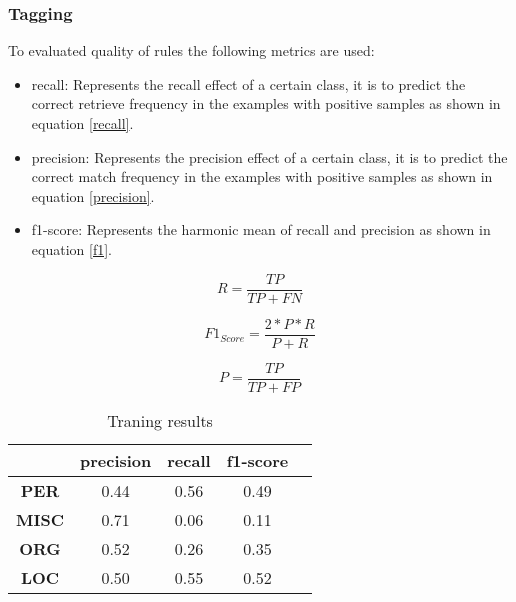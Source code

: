 \subsubsection{Tagging}

To evaluated quality of rules the following metrics are used:
\begin{itemize}
  \item recall: Represents the recall effect of a certain class, it is to predict the correct retrieve frequency in the examples with positive samples as shown in equation \ref{recall}.
  \item precision: Represents the precision effect of a certain class, it is to predict the correct match frequency in the examples with positive samples as shown in equation \ref{precision}.
  \item f1-score: Represents the harmonic mean of recall and precision as shown in equation \ref{f1}.
\end{itemize}

\begin{equation}
  \label{recall}
  R = \frac{TP}{TP + FN}
\end{equation}

\begin{equation}
  \label{f1}
  F1_{Score} = \frac{2*P*R}{P + R}
\end{equation}

\begin{equation}
  \label{precision}
  P = \frac{TP}{TP + FP}
\end{equation}


\begin{table}[ht]
  \centering
  \begin{tabular}{|c|c|c|c|c|}
    \hline
    \textbf{}     & \textbf{precision} & \textbf{recall} & \textbf{f1-score} \\ \hline
    \textbf{PER}  & 0.44               & 0.56            & 0.49              \\
    \textbf{MISC} & 0.71               & 0.06            & 0.11              \\
    \textbf{ORG}  & 0.52               & 0.26            & 0.35              \\
    \textbf{LOC}  & 0.50               & 0.55            & 0.52              \\ \hline
  \end{tabular}
  \caption{Traning results}
  \label{tab:results}
\end{table}


